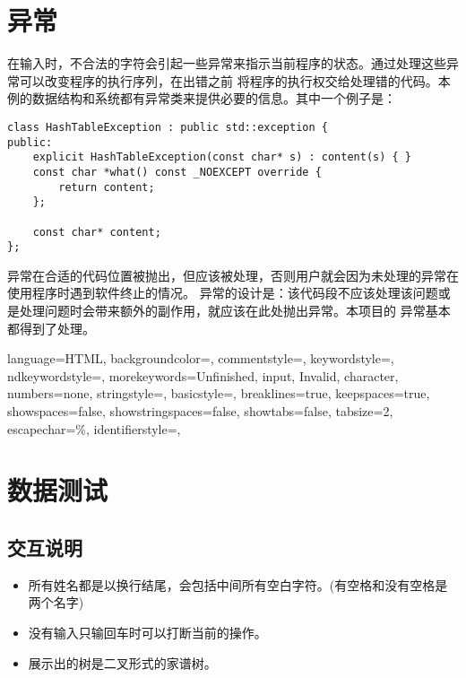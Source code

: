 
\chapter{异常}
在输入时，不合法的字符会引起一些异常来指示当前程序的状态。通过处理这些异常可以改变程序的执行序列，在出错之前%
将程序的执行权交给处理错的代码。本例的数据结构和系统都有异常类来提供必要的信息。其中一个例子是：
\begin{lstlisting}[firstnumber=244, caption=HashTableException 异常类]
class HashTableException : public std::exception {
public:
    explicit HashTableException(const char* s) : content(s) { }
    const char *what() const _NOEXCEPT override {
        return content;
    };

    const char* content;
};
\end{lstlisting}

异常在合适的代码位置被抛出，但应该被处理，否则用户就会因为未处理的异常在使用程序时遇到软件终止的情况。%
异常的设计是：该代码段不应该处理该问题或是处理问题时会带来额外的副作用，就应该在此处抛出异常。本项目的%
异常基本都得到了处理。


 {
    language=HTML,
    backgroundcolor=\color{CPPDark},   
    commentstyle=\color{CPPLight},
    keywordstyle=\color{red},
    ndkeywordstyle={},
    morekeywords={Unfinished, input, Invalid, character},
    numbers=none,
    stringstyle={},
    basicstyle=\fira\color{white}\footnotesize,
    breaklines=true,                                     
    keepspaces=true,                                     
    showspaces=false,                
    showstringspaces=false,
    showtabs=false,                  
    tabsize=2,
    escapechar=\%,
    identifierstyle={},
}

\chapter{数据测试}

\section{交互说明}

\begin{itemize}
    \item 所有姓名都是以换行结尾，会包括中间所有空白字符。(有空格和没有空格是两个名字)
    \item 没有输入只输回车时可以打断当前的操作。
    \item 展示出的树是二叉形式的家谱树。
\end{itemize}

